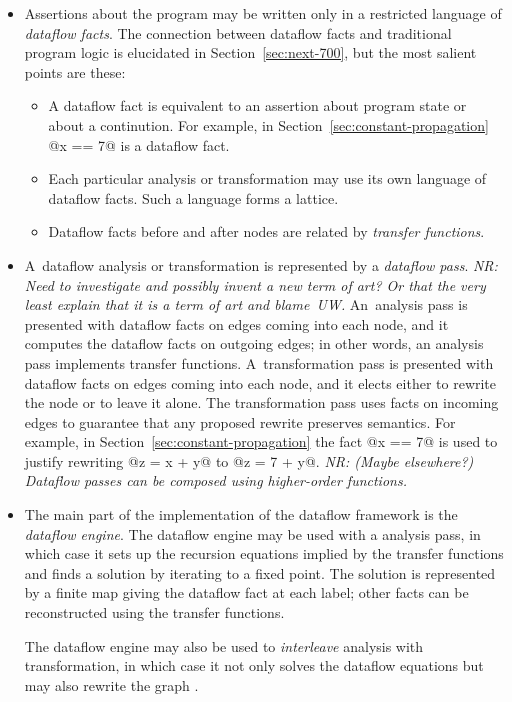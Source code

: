 \documentclass[blockstyle,preprint,nocopyrightspace]{sigplanconf}
\let\cite\citep
\newcommand{\authornote}[1]{{\em #1}}
\newcommand{\norman}[1]{\authornote{NR: #1}}
\let\remark\norman
\newcommand\secref[1]{Section~\ref{sec:#1}}
\begin{document}
\begin{itemize}
\item
Assertions about the program may be written only in a restricted
language of \emph{dataflow facts}.
The connection between dataflow facts and traditional program logic is
elucidated in \secref{next-700}, but the most salient points are
these:
\begin{itemize}
\item
A dataflow fact is equivalent to an assertion about program state or
about a continution.
For example, in \secref{constant-propagation} @x == 7@ is a dataflow
fact. 
\item
Each particular analysis or transformation may use its own language of
dataflow facts.
Such a language forms a lattice.
\item
Dataflow facts before and after nodes are related by \emph{transfer
functions}.
\end{itemize}
\item
A~dataflow analysis or transformation is represented by a
\emph{dataflow pass}.
\remark{Need to investigate and possibly invent a new term of art?
Or that the very least explain that it \emph{is} a term of art and
blame~UW.} 
%
An~analysis pass is presented with dataflow facts on edges coming
into each node, and it computes the dataflow facts on outgoing edges;
in other words, an analysis pass implements transfer functions.
A~transformation pass is presented with dataflow facts on edges coming
into each node, and it elects either to rewrite the node or to leave
it alone.
The transformation pass uses facts on incoming edges to guarantee that
any proposed rewrite
preserves semantics.
For example, in \secref{constant-propagation} the fact @x == 7@ is
used to justify rewriting @z = x + y@ to @z = 7 + y@.
%
\remark{(Maybe elsewhere?) Dataflow passes can be composed using
higher-order functions. }
\item
The main part of the implementation of the dataflow framework is the
\emph{dataflow engine}.
The dataflow engine may be used with a analysis pass,
in which case it sets up the recursion equations implied by the
transfer functions and finds a solution by iterating to a fixed point.
The solution is represented by a finite map giving the dataflow fact
at each label; other facts can be reconstructed using the transfer functions.

The dataflow engine may also be used to \emph{interleave} analysis
with transformation, in which case
it not only solves the dataflow equations but may also rewrite the
graph  \cite{lerner-grove-chambers:2002}. 
\end{itemize}
\end{document}
